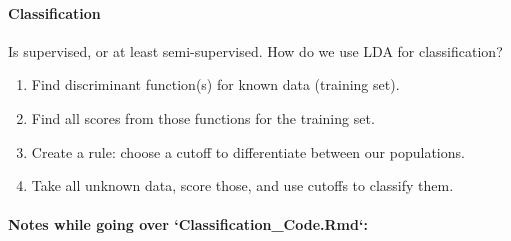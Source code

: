 \documentclass[]{article}
\providecommand{\tightlist}{%
  \setlength{\itemsep}{0pt}\setlength{\parskip}{0pt}}
\let\oldparagraph\paragraph
\renewcommand{\paragraph}[1]{\oldparagraph{#1}\mbox{}}
\begin{document}
\hypertarget{classification}{%
\paragraph{Classification}\label{classification}}

Is supervised, or at least semi-supervised. How do we use LDA for
classification?

\begin{enumerate}
\def\labelenumi{\arabic{enumi}.}
\tightlist
\item
  Find discriminant function(s) for known data (training set).
\item
  Find all scores from those functions for the training set.
\item
  Create a rule: choose a cutoff to differentiate between our
  populations.
\item
  Take all unknown data, score those, and use cutoffs to classify them.
\end{enumerate}

\hypertarget{notes-while-going-over-classification_code.rmd}{%
\paragraph{Notes while going over
`Classification\_Code.Rmd`:}\label{notes-while-going-over-classification_code.rmd}}
\end{document}
